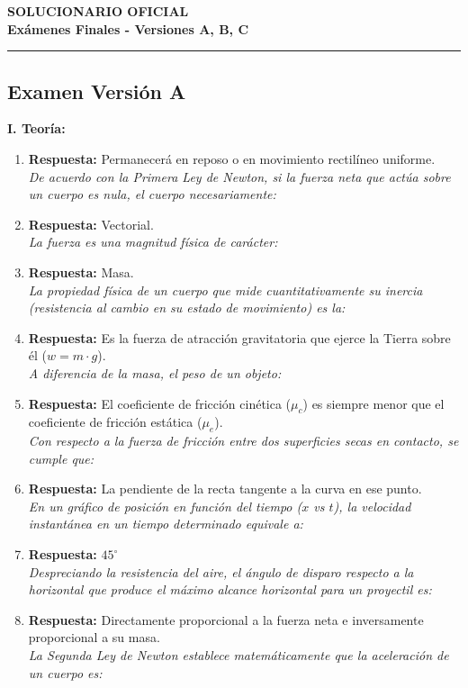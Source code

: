 \documentclass[11pt,a4paper]{article}
\begin{document}
\begin{center}
    \textbf{\Large SOLUCIONARIO OFICIAL} \\[0.2cm]
    \textbf{\large Exámenes Finales - Versiones A, B, C} \\[0.4cm]
\end{center}

\hrule
\vspace{0.4cm}
\subsection*{Examen Versión A}\textbf{I. Teoría:}\begin{enumerate}    \item \textbf{Respuesta:} Permanecerá en reposo o en movimiento rectilíneo uniforme. \\ \textit{De acuerdo con la Primera Ley de Newton, si la fuerza neta que actúa sobre un cuerpo es nula, el cuerpo necesariamente:}
    \item \textbf{Respuesta:} Vectorial. \\ \textit{La fuerza es una magnitud física de carácter:}
    \item \textbf{Respuesta:} Masa. \\ \textit{La propiedad física de un cuerpo que mide cuantitativamente su inercia (resistencia al cambio en su estado de movimiento) es la:}
    \item \textbf{Respuesta:} Es la fuerza de atracción gravitatoria que ejerce la Tierra sobre él ($w = m \cdot g$). \\ \textit{A diferencia de la masa, el peso de un objeto:}
    \item \textbf{Respuesta:} El coeficiente de fricción cinética ($\mu_c$) es siempre menor que el coeficiente de fricción estática ($\mu_e$). \\ \textit{Con respecto a la fuerza de fricción entre dos superficies secas en contacto, se cumple que:}
    \item \textbf{Respuesta:} La pendiente de la recta tangente a la curva en ese punto. \\ \textit{En un gráfico de posición en función del tiempo ($x$ vs $t$), la velocidad instantánea en un tiempo determinado equivale a:}
    \item \textbf{Respuesta:} $45^\circ$ \\ \textit{Despreciando la resistencia del aire, el ángulo de disparo respecto a la horizontal que produce el máximo alcance horizontal para un proyectil es:}
    \item \textbf{Respuesta:} Directamente proporcional a la fuerza neta e inversamente proporcional a su masa. \\ \textit{La Segunda Ley de Newton establece matemáticamente que la aceleración de un cuerpo es:}

\end{enumerate}
\end{document}
